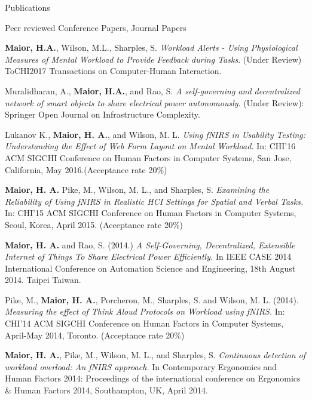 \documentclass{resume} %
\begin{document}
\begin{rSection}{Publications}
\begin{rSubsection}{ }{ }{ }{Peer reviewed Conference Papers, Journal Papers}
	
\item \textbf{Maior, H.A.}, Wilson, M.L., Sharples, S. \emph{Workload Alerts - Using Physiological Measures of Mental Workload to Provide Feedback during Tasks}. (Under Review) ToCHI2017 Transactions on Computer-Human Interaction.

\item Muralidharan, A., \textbf{Maior, H.A.}, and Rao, S. \emph{A self-governing and decentralized network of smart objects to share electrical power autonomously}. (Under Review): Springer Open Journal on Infrastructure Complexity.

\item Lukanov K., \textbf{Maior, H. A.}, and Wilson, M. L. \emph{Using fNIRS in Usability Testing: Understanding the Effect of Web Form Layout on Mental Workload.} In: CHI'16 ACM SIGCHI Conference on Human Factors in Computer Systems, San Jose, California, May 2016.(Acceptance rate 20\%)

\item \textbf{Maior, H. A.} Pike, M., Wilson, M. L., and Sharples, S. \emph{Examining the Reliability of Using fNIRS in Realistic HCI Settings for Spatial and Verbal Tasks.} In: CHI'15 ACM SIGCHI Conference on Human Factors in Computer Systems, Seoul, Korea, April 2015. (Acceptance rate 20\%)

\item \textbf{Maior, H. A.} and Rao, S. (2014.) \emph{A Self-Governing, Decentralized, Extensible Internet of Things To Share Electrical Power Efficiently.} In IEEE CASE 2014 International Conference on Automation Science and Engineering, 18th August 2014. Taipei Taiwan.

\item Pike, M., \textbf{Maior, H. A.}, Porcheron, M., Sharples, S. and Wilson, M. L. (2014). \emph{Measuring the effect of Think Aloud Protocols on Workload using fNIRS.} In: CHI'14 ACM SIGCHI Conference on Human Factors in Computer Systems, April-May 2014, Toronto. (Acceptance rate 20\%)

\item \textbf{Maior, H. A.}, Pike, M., Wilson, M. L., and Sharples, S. \emph{Continuous detection of workload overload: An fNIRS approach.} In Contemporary Ergonomics and Human Factors 2014: Proceedings of the international conference on Ergonomics \& Human Factors 2014, Southampton, UK, April 2014.
\end{rSubsection}


\end{rSection}
\end{document}
